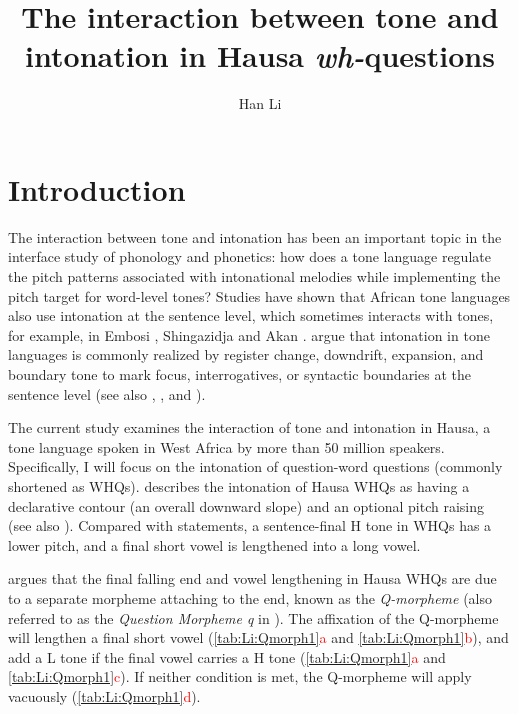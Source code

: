 \documentclass[output=paper,colorlinks,citecolor=brown
]{langscibook}
\author{Han Li\affiliation{Stony Brook University}}
\title{The interaction between tone and intonation in Hausa \textit{wh-}questions}
\begin{document}
\maketitle
\section{Introduction}
The interaction between tone and intonation has been an important topic in the interface study of phonology and phonetics: how does a tone language regulate the pitch patterns associated with intonational melodies while implementing the pitch target for word-level tones? Studies have shown that African tone languages also use intonation at the sentence level, which sometimes interacts with tones, for example, in Embosi \citep{embosi}, Shingazidja \citep{patin2017tone} and Akan \citep{kugler2017tone}. \citet[p.2]{downing} argue that intonation in tone languages is commonly realized by register change, downdrift, expansion, and boundary tone to mark focus, interrogatives, or syntactic boundaries at the sentence level (see also \citealt{cruttenden1997intonation}, \citealt{yipbook}, and \citealt{ladd2008intonational}).


The current study examines the interaction of tone and intonation in Hausa, a tone language spoken in West Africa by more than 50 million speakers. Specifically, I will focus on the intonation of question-word questions (commonly shortened as WHQs). \citet{newmangrammar} describes the intonation of Hausa WHQs as having a declarative contour (an overall downward slope) and an optional pitch raising (see also \citealt{kk}). Compared with statements, a sentence-final H tone in WHQs has a lower pitch, and a final short vowel is lengthened into a long vowel.


\citet{newmangrammar} argues that the final falling end and vowel lengthening in Hausa WHQs are due to a separate morpheme attaching to the end, known as the \textit{Q-morpheme} (also referred to as the \textit{Question Morpheme q} in \citet{newmans1981q}). The affixation of the Q-morpheme will lengthen a final short vowel (\ref{tab:Li:Qmorph1}\textcolor{red}{a} and \ref{tab:Li:Qmorph1}\textcolor{red}{b}), and add a L tone if the final vowel carries a H tone (\ref{tab:Li:Qmorph1}\textcolor{red}{a} and \ref{tab:Li:Qmorph1}\textcolor{red}{c}). If neither condition is met, the Q-morpheme will apply vacuously (\ref{tab:Li:Qmorph1}\textcolor{red}{d}). 
\end{document}
